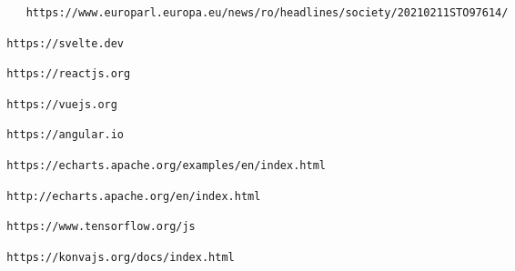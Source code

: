 \begin{thebibliography}{99}
 \begin{verbatim}
	https://www.europarl.europa.eu/news/ro/headlines/society/20210211STO97614/
\end{verbatim}

 \begin{verbatim} https://svelte.dev
\end{verbatim}

 \begin{verbatim} https://reactjs.org
\end{verbatim}

 \begin{verbatim} https://vuejs.org
\end{verbatim}

 \begin{verbatim} https://angular.io
\end{verbatim}

 \begin{verbatim} https://echarts.apache.org/examples/en/index.html
\end{verbatim}

 \begin{verbatim} http://echarts.apache.org/en/index.html
\end{verbatim}

 \begin{verbatim} https://www.tensorflow.org/js
\end{verbatim}

 \begin{verbatim} https://konvajs.org/docs/index.html
\end{verbatim}

\end{thebibliography}

